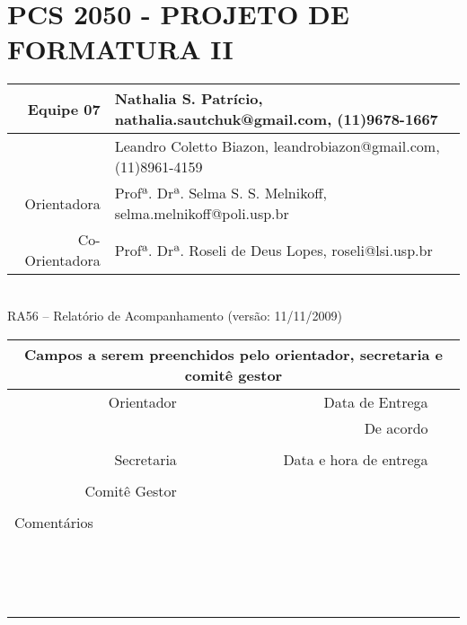 \documentclass[a4paper,12pt,font=plain,header=plain]{abnt}
\begin{document}
  \capa

	\renewenvironment{center}{}{}
	\section*{PCS 2050 - PROJETO DE FORMATURA II}
	
	\begin{tabular}[|l|]{ |r|l| }
	\hline
				Equipe 07 & Nathalia S. Patrício, nathalia.sautchuk@gmail.com, (11)9678-1667 \\
			\hline
				& Leandro Coletto Biazon, leandrobiazon@gmail.com, (11)8961-4159 \\
			\hline
					Orientadora & Profª. Drª. Selma S. S. Melnikoff, selma.melnikoff@poli.usp.br \\
			\hline
				Co-Orientadora & Profª. Drª. Roseli de Deus Lopes, roseli@lsi.usp.br \\
			\hline
			\end{tabular} \\
	
			RA56 – Relatório de Acompanhamento (versão: 11/11/2009) \\
	
			\begin{tabular}{ |r|r|r| }
	
			\hline
				\multicolumn{3}{|c|}{Campos a serem preenchidos pelo orientador, secretaria e comitê gestor} \\
			\hline
				Orientador & Data de Entrega &  \\
			\hline
				& De acordo &  \\
			\hline
				& &  \\
			\hline
				Secretaria & Data e hora de entrega &  \\
			\hline
				&  &  \\
			\hline
				Comitê Gestor &  &  \\
			\hline
			&  &  \\
			\hline
				\multicolumn{3}{|l|}{Comentários} \\
				\multicolumn{3}{|l|}{} \\
				\multicolumn{3}{|l|}{} \\
				\multicolumn{3}{|l|}{} \\
				\multicolumn{3}{|l|}{} \\
				\multicolumn{3}{|l|}{} \\
				\multicolumn{3}{|l|}{} \\
				\multicolumn{3}{|l|}{} \\
				\multicolumn{3}{|l|}{} \\
				\multicolumn{3}{|l|}{} \\
				\multicolumn{3}{|l|}{} \\
				\multicolumn{3}{|l|}{} \\
				\multicolumn{3}{|l|}{} \\
				\multicolumn{3}{|l|}{} \\
				\multicolumn{3}{|l|}{} \\
				\multicolumn{3}{|l|}{} \\
			\hline
			\end{tabular}
\end{document}
